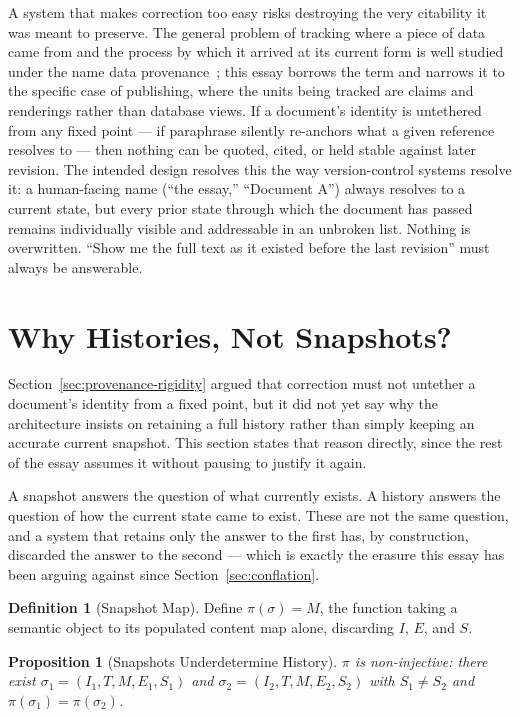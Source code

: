 \documentclass[11pt]{article}
\newtheorem{proposition}[theorem]{Proposition}
\theoremstyle{definition}
\newtheorem{definition}[theorem]{Definition}
\begin{document}
A system that makes correction too easy risks destroying the very citability it was meant to preserve. The general problem of tracking where a piece of data came from and the process by which it arrived at its current form is well studied under the name data provenance~\cite{buneman2001}; this essay borrows the term and narrows it to the specific case of publishing, where the units being tracked are claims and renderings rather than database views. If a document's identity is untethered from any fixed point --- if paraphrase silently re-anchors what a given reference resolves to --- then nothing can be quoted, cited, or held stable against later revision. The intended design resolves this the way version-control systems resolve it: a human-facing name (``the essay,'' ``Document A'') always resolves to a current state, but every prior state through which the document has passed remains individually visible and addressable in an unbroken list. Nothing is overwritten. ``Show me the full text as it existed before the last revision'' must always be answerable.

\section{Why Histories, Not Snapshots?}
\label{sec:histories-not-snapshots}

Section~\ref{sec:provenance-rigidity} argued that correction must not untether a document's identity from a fixed point, but it did not yet say why the architecture insists on retaining a full history rather than simply keeping an accurate current snapshot. This section states that reason directly, since the rest of the essay assumes it without pausing to justify it again.

A snapshot answers the question of what currently exists. A history answers the question of how the current state came to exist. These are not the same question, and a system that retains only the answer to the first has, by construction, discarded the answer to the second --- which is exactly the erasure this essay has been arguing against since Section~\ref{sec:conflation}.

\begin{definition}[Snapshot Map]
\label{def:snapshot-map}
Define $\pi(\sigma) = M$, the function taking a semantic object to its populated content map alone, discarding $I$, $E$, and $S$.
\end{definition}

\begin{proposition}[Snapshots Underdetermine History]
\label{prop:snapshot-underdetermine}
$\pi$ is non-injective: there exist $\sigma_1 = (I_1, T, M, E_1, S_1)$ and $\sigma_2 = (I_2, T, M, E_2, S_2)$ with $S_1 \neq S_2$ and $\pi(\sigma_1) = \pi(\sigma_2)$.
\end{proposition}
\end{document}

